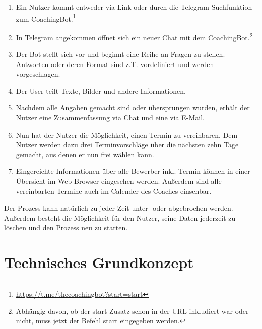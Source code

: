 	\begin{enumerate}
		\item Ein Nutzer kommt entweder via Link oder durch die Telegram-Suchfunktion zum CoachingBot.\footnote{\url{https://t.me/thecoachingbot?start=start}}
		\item In Telegram angekommen öffnet sich ein neuer Chat mit dem CoachingBot.\footnote{Abhängig davon, ob der start-Zusatz schon in der URL inkludiert war oder nicht, muss jetzt der Befehl \/start eingegeben werden.}
		\item Der Bot stellt sich vor und beginnt eine Reihe an Fragen zu stellen. Antworten oder deren Format sind z.T. vordefiniert und werden vorgeschlagen.
		\item Der User teilt Texte, Bilder und andere Informationen.
		\item Nachdem alle Angaben gemacht sind oder übersprungen wurden, erhält der Nutzer eine Zusammenfassung via Chat und eine via E-Mail.
		\item Nun hat der Nutzer die Möglichkeit, einen Termin zu vereinbaren. Dem Nutzer werden dazu drei Terminvorschläge über die nächsten zehn Tage gemacht, aus denen er nun frei wählen kann.
		\item Eingereichte Informationen über alle Bewerber inkl. Termin können in einer Übersicht im Web-Browser eingesehen werden. Außerdem sind alle vereinbarten Termine auch im Calender des Coaches einsehbar. 
	\end{enumerate}
	Der Prozess kann natürlich zu jeder Zeit unter- oder abgebrochen werden. Außerdem besteht die Möglichkeit für den Nutzer, seine Daten jederzeit zu löschen und den Prozess neu zu starten.

\section{Technisches Grundkonzept}

